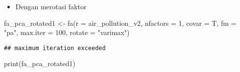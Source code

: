 \documentclass[
]{article}
\newenvironment{Shaded}{\begin{snugshade}}{\end{snugshade}}
\newcommand{\AttributeTok}[1]{\textcolor[rgb]{0.77,0.63,0.00}{#1}}
\newcommand{\DecValTok}[1]{\textcolor[rgb]{0.00,0.00,0.81}{#1}}
\newcommand{\FunctionTok}[1]{\textcolor[rgb]{0.00,0.00,0.00}{#1}}
\newcommand{\NormalTok}[1]{#1}
\newcommand{\OtherTok}[1]{\textcolor[rgb]{0.56,0.35,0.01}{#1}}
\newcommand{\StringTok}[1]{\textcolor[rgb]{0.31,0.60,0.02}{#1}}
\providecommand{\tightlist}{%
  \setlength{\itemsep}{0pt}\setlength{\parskip}{0pt}}
\begin{document}
\begin{itemize}
\tightlist
\item
  Dengan merotasi faktor
\end{itemize}

\begin{Shaded}
\begin{Highlighting}[]
\NormalTok{fa\_pca\_rotated1 }\OtherTok{\textless{}{-}} \FunctionTok{fa}\NormalTok{(}\AttributeTok{r =}\NormalTok{ air\_pollution\_v2, }\AttributeTok{nfactors =} \DecValTok{1}\NormalTok{, }\AttributeTok{covar =}\NormalTok{ T, }\AttributeTok{fm =} \StringTok{"pa"}\NormalTok{, }\AttributeTok{max.iter =} \DecValTok{100}\NormalTok{, }\AttributeTok{rotate =} \StringTok{"varimax"}\NormalTok{)}
\end{Highlighting}
\end{Shaded}

\begin{verbatim}
## maximum iteration exceeded
\end{verbatim}

\begin{Shaded}
\begin{Highlighting}[]
\FunctionTok{print}\NormalTok{(fa\_pca\_rotated1)}
\end{Highlighting}
\end{Shaded}
\end{document}
